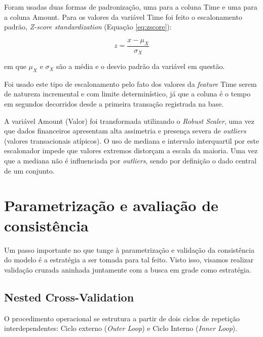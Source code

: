 \documentclass{uflamon}          %
\begin{document}
Foram usadas duas formas de padronização, uma para a coluna Time e uma para a coluna Amount. Para os valores da variável Time foi feito o escalonamento padrão, \textit{Z-score standardization} (Equação \ref{eq:zscore}):

$$z = \frac{x - \mu_X}{\sigma_X}$$
\label{eq:zscore}

em que $\mu_X$ e $\sigma_X$ são a média e o desvio padrão da variável em questão.

Foi usado este tipo de escalonamento pelo fato dos valores da \textit{feature} Time serem de natureza incremental e com limite determinístico, já que a coluna é o tempo em segundos decorridos desde a primeira transação registrada na base.

A variável Amount (Valor) foi transformada utilizando o \textit{Robust Scaler}, uma vez que dados financeiros apresentam alta assimetria e presença severa de \textit{outliers} (valores transacionais atípicos). O uso de mediana e intervalo interquartil por este escalonador impede que valores extremos distorçam a escala da maioria. Uma vez que a mediana não é influenciada por \textit{outliers}, sendo por definição o dado central de um conjunto.


\section{Parametrização e avaliação de consistência}

Um passo importante no que tange à parametrização e validação da consistência do modelo é a estratégia a ser tomada para tal feito. Visto isso, visamos realizar validação cruzada aninhada juntamente com a busca em grade como estratégia.

\subsection{Nested Cross-Validation}

O procedimento operacional se estrutura a partir de dois ciclos de repetição interdependentes: Ciclo externo (\textit{Outer Loop}) e Ciclo Interno (\textit{Inner Loop}).
\end{document}
